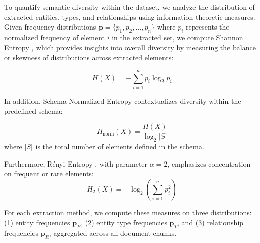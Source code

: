 To quantify semantic diversity within the dataset, we analyze the distribution of extracted entities, types, and relationships using information-theoretic measures. Given frequency distributions $\mathbf{p} = \{p_1, p_2, \ldots, p_n\}$ where $p_i$ represents the normalized frequency of element $i$ in the extracted set, we compute Shannon Entropy \cite{shannon1948mathematical}, which provides insights into overall diversity by measuring the balance or skewness of distributions across extracted elements: 

\begin{equation}
H(X) = -\sum_{i=1}^{n} p_i \log_2 p_i
\end{equation} 

In addition, Schema-Normalized Entropy contextualizes diversity within the predefined schema:

\begin{equation}
H_{\text{norm}}(X) = \frac{H(X)}{\log_2 |S|}
\end{equation}
where $|S|$ is the total number of elements defined in the schema. 

Furthermore, Rényi Entropy \cite{renyi1961measures}, with parameter $\alpha = 2$, emphasizes concentration on frequent or rare elements:
\begin{equation}
H_2(X) = -\log_2 \left(\sum_{i=1}^{n} p_i^2\right)
\end{equation}

For each extraction method, we compute these measures on three distributions: 
(1) entity frequencies $\mathbf{p}_E$, (2) entity type frequencies $\mathbf{p}_T$, and (3) relationship frequencies $\mathbf{p}_R$, aggregated across all document chunks.

